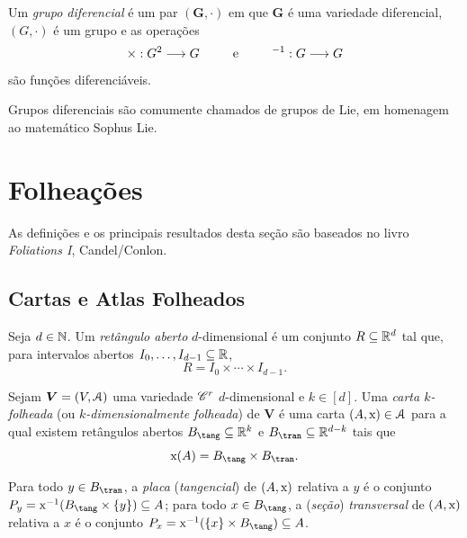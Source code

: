 \begin{defi}
Um \emph{grupo diferencial} é um par $(\bm G,\cdot)$ em que $\bm G$ é uma variedade diferencial, $(G,\cdot)$ é um grupo e as operações
	\begin{equation*}
	\times: G^2 \longrightarrow G \qquad\text{\ \ e\ \ }\qquad ^{-1}: G \longrightarrow G
	\end{equation*}
são funções diferenciáveis.
\end{defi}

Grupos diferenciais são comumente chamados de grupos de Lie, em homenagem ao matemático Sophus Lie.













\section{Folheações}

As definições e os principais resultados desta seção são baseados no livro \textit{Foliations I}, Candel/Conlon.

\subsection{Cartas e Atlas Folheados}

\begin{defi}
Seja $d \in \mathbb{N}$. Um \emph{retângulo aberto} $d$-dimensional é um conjunto $R \subseteq \mathbb{R}^d$ tal que, para intervalos abertos $I_0,\ldots,I_{d-1} \subseteq \mathbb{R}$,
	\begin{equation*}
	R = I_0 \times \cdots \times I_{d-1}.
	\end{equation*}
\end{defi}

\begin{defi}
Sejam $\bm V = (V,\mathcal{A})$ uma variedade $\mathscr{C}^r$ $d$-dimensional e $k \in [d]$. Uma \emph{carta $k$-folheada} (ou \emph{$k$-dimensionalmente folheada}) de $\bm V$ é uma carta $(A,\mathrm{x}) \in \mathcal{A}$ para a qual existem retângulos abertos $B_\tang \subseteq \R^k$ e $B_\tran \subseteq \R^{d-k}$ tais que
	\begin{equation*}
	\x(A) = B_\tang \times B_\tran.
	\end{equation*}

Para todo $y \in B_\tran$, a \emph{placa} (\emph{tangencial}) de $(A,\mathrm{x})$ relativa a $y$ é o conjunto $P_y = \x\inv(B_\tang \times \{y\}) \subseteq A$; para todo $x \in B_\tang$, a (\emph{seção}) \emph{transversal} de $(A,\mathrm{x})$ relativa a $x$ é o conjunto $P_x = \x\inv(\{x\} \times B_\tang) \subseteq A$.
\end{defi}

